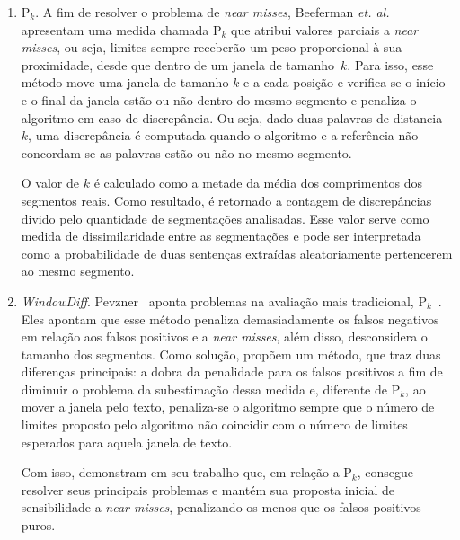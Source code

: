 \begin{enumerate}

	\item P$_k$. A fim de resolver o problema de \textit{near misses}, Beeferman \textit{et. al.}~\cite{Beeferman1999} apresentam uma medida chamada P$_k$ que atribui 
%
valores parciais a \textit{near misses}, 
%
ou seja, limites sempre receberão um peso proporcional à sua proximidade, desde que dentro de um janela de tamanho~$k$.
%
Para isso, esse método move uma janela de tamanho $k$ e a cada posição e verifica se o início e o final da janela estão ou não dentro do mesmo segmento e penaliza o algoritmo em caso de discrepância. Ou seja, dado duas palavras de distancia $k$, uma discrepância é computada quando o algoritmo e a referência não concordam se as palavras estão ou não no mesmo segmento.

O valor de $k$ é calculado como a metade da média dos comprimentos dos segmentos reais. Como resultado, é retornado a contagem de discrepâncias divido pelo quantidade de segmentações analisadas. Esse valor serve como medida de dissimilaridade entre as segmentações e pode ser interpretada como a probabilidade de duas sentenças extraídas aleatoriamente pertencerem ao mesmo segmento.

\item \textit{WindowDiff}. Pevzner~\cite{Pevzner2002} aponta problemas na avaliação mais tradicional, P$_k$~\cite{Beeferman1999}. Eles apontam que esse método penaliza demasiadamente os falsos negativos em relação aos falsos positivos e a \textit{near misses}, além disso, desconsidera o tamanho dos segmentos. Como solução, propõem um método, que traz duas diferenças principais: a dobra da penalidade para os falsos positivos a fim de diminuir o problema da subestimação dessa medida e, diferente de P$_k$, ao mover a janela pelo texto, penaliza-se o algoritmo sempre que o número de limites proposto pelo algoritmo não coincidir com o número de limites esperados para aquela janela de texto. 

Com isso, demonstram em seu trabalho que, em relação a P$_k$, consegue resolver seus principais problemas e mantém sua proposta inicial de sensibilidade a \textit{near misses}, penalizando-os menos que os falsos positivos puros.


\end{enumerate}














